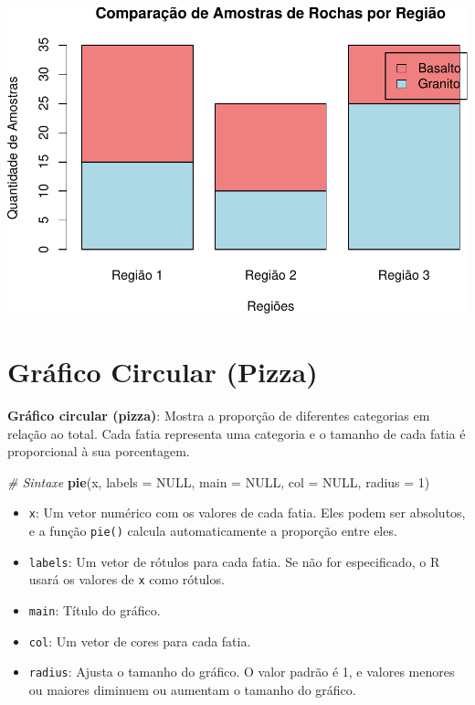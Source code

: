 \documentclass[
]{book}
\newenvironment{Shaded}{\begin{snugshade}}{\end{snugshade}}
\newcommand{\AttributeTok}[1]{\textcolor[rgb]{0.13,0.29,0.53}{#1}}
\newcommand{\CommentTok}[1]{\textcolor[rgb]{0.56,0.35,0.01}{\textit{#1}}}
\newcommand{\ConstantTok}[1]{\textcolor[rgb]{0.56,0.35,0.01}{#1}}
\newcommand{\DecValTok}[1]{\textcolor[rgb]{0.00,0.00,0.81}{#1}}
\newcommand{\FunctionTok}[1]{\textcolor[rgb]{0.13,0.29,0.53}{\textbf{#1}}}
\newcommand{\NormalTok}[1]{#1}
\providecommand{\tightlist}{%
  \setlength{\itemsep}{0pt}\setlength{\parskip}{0pt}}
\begin{document}
\includegraphics{introR_files/figure-latex/unnamed-chunk-165-1.pdf}

\section{Gráfico Circular (Pizza)}\label{gruxe1fico-circular-pizza}

\textbf{Gráfico circular (pizza)}: Mostra a proporção de diferentes
categorias em relação ao total. Cada fatia representa uma categoria e o
tamanho de cada fatia é proporcional à sua porcentagem.

\begin{Shaded}
\begin{Highlighting}[]
\CommentTok{\# Sintaxe}
\FunctionTok{pie}\NormalTok{(x, }\AttributeTok{labels =} \ConstantTok{NULL}\NormalTok{, }\AttributeTok{main =} \ConstantTok{NULL}\NormalTok{, }\AttributeTok{col =} \ConstantTok{NULL}\NormalTok{, }\AttributeTok{radius =} \DecValTok{1}\NormalTok{)}
\end{Highlighting}
\end{Shaded}

\begin{itemize}
\tightlist
\item
  \texttt{x}: Um vetor numérico com os valores de cada fatia. Eles podem ser absolutos, e a função \texttt{pie()} calcula automaticamente a proporção entre eles.
\item
  \texttt{labels}: Um vetor de rótulos para cada fatia. Se não for especificado, o R usará os valores de \texttt{x} como rótulos.
\item
  \texttt{main}: Título do gráfico.
\item
  \texttt{col}: Um vetor de cores para cada fatia.
\item
  \texttt{radius}: Ajusta o tamanho do gráfico. O valor padrão é 1, e valores menores ou maiores diminuem ou aumentam o tamanho do gráfico.
\end{itemize}
\end{document}
